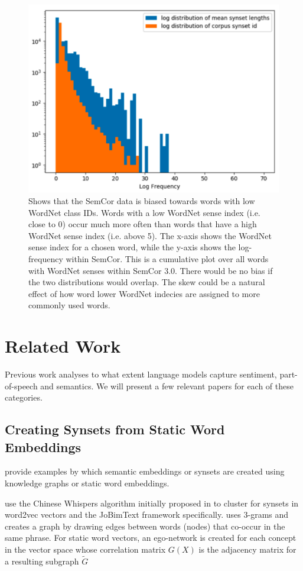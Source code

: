\documentclass[a4paper,12pt,oneside,openright]{report}
\begin{document}
\begin{figure}[h]
	\center
  \includegraphics[width=0.6\linewidth]{./assets/background/semcor_skew.png}
  \caption{Shows that the SemCor data is biased towards words with low WordNet class IDs. 
  Words with a low WordNet sense index (i.e. close to 0) occur much more often than words that have a high WordNet sense index (i.e. above 5).
  The x-axis shows the WordNet sense index for a chosen word, while the y-axis shows the log-frequency within SemCor. 
  This is a cumulative plot over all words with WordNet senses within SemCor 3.0.
    There would be no bias if the two distributions would overlap.
  The skew could be a natural effect of how word lower WordNet indecies are assigned to more commonly used words.
  }
  \label{fig:embeddings_by_language}
\end{figure}


\chapter{Related Work}\label{section:RelatedWork} 


Previous work analyses to what extent language models capture sentiment, part-of-speech and semantics.
We will present a few relevant papers for each of these categories.

\section{Creating Synsets from Static Word Embeddings}\label{section_clustering}

\cite{pelevina16, biemann13, remus18, arefyev19, denkowski09} provide examples by which semantic embeddings or synsets are created using knowledge graphs or static word embeddings.

\cite{pelevina16, biemann13} use the Chinese Whispers algorithm initially proposed in \cite{biemann06} to cluster for synsets in word2vec vectors and the JoBimText framework \cite{biemann13} specifically.
\cite{denkowski09} uses 3-grams and creates a graph by drawing edges between words (nodes) that co-occur in the same phrase.
For static word vectors, an ego-network is created for each concept in the vector space whose correlation matrix $G(X)$ is the adjacency matrix for a resulting subgraph $\tilde{G}$
\end{document}
